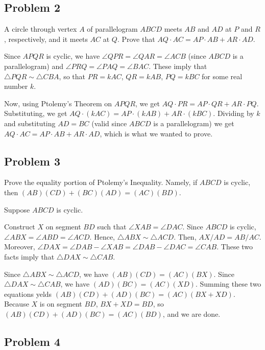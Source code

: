 \subsection{Problem 2}

A circle through vertex $ A$ of parallelogram $ ABCD$ meets $ AB$ and $ AD$ at $ P$ and $ R$, respectively, and it meets $ AC$ at $ Q$. Prove that $ AQ\cdot AC= AP \cdot AB + AR\cdot AD$.

\begin{mdsoln}
    Since $ APQR$ is cyclic, we have $ \angle QPR=\angle QAR=\angle ACB$ (since $ ABCD$ is a parallelogram) and $ \angle PRQ=\angle PAQ=\angle BAC$. These imply that $ \triangle PQR\sim \triangle CBA$, so that $ PR=kAC$, $ QR=kAB$, $ PQ=kBC$ for some real number $ k$.

    Now, using Ptolemy’s Theorem on $ APQR$, we get $ AQ\cdot PR=AP\cdot QR+AR\cdot PQ$. Substituting, we get $ AQ\cdot (kAC)=AP\cdot (kAB)+AR\cdot (kBC)$. Dividing by $ k$ and substituting $ AD=BC$ (valid since $ ABCD$ is a parallelogram) we get $ AQ\cdot AC= AP \cdot AB + AR\cdot AD$, which is what we wanted to prove.
\end{mdsoln}


\subsection{Problem 3}

Prove the equality portion of Ptolemy’s Inequality. Namely, if $ ABCD$ is cyclic, then $ (AB)(CD) + (BC)(AD) = (AC)(BD)$.

\begin{mdsoln}
    Suppose $ ABCD$ is cyclic.

Construct $ X$ on segment $ BD$ such that $ \angle XAB=\angle DAC$. Since $ ABCD$ is cyclic, $ \angle ABX=\angle ABD=\angle ACD$. Hence, $ \triangle ABX\sim \triangle ACD$. Then, $ AX/AD=AB/AC$. Moreover, $ \angle DAX=\angle DAB-\angle XAB=\angle DAB-\angle DAC=\angle CAB$. These two facts imply that $ \triangle DAX\sim \triangle CAB$.

Since $ \triangle ABX\sim \triangle ACD$, we have $ (AB)(CD)=(AC)(BX)$. Since $ \triangle DAX\sim \triangle CAB$, we have $ (AD)(BC)=(AC)(XD)$. Summing these two equations yelds $ (AB)(CD)+(AD)(BC)=(AC)(BX+XD)$. Because $ X$ is on segment $ BD$, $ BX+XD=BD$, so $ (AB)(CD)+(AD)(BC)=(AC)(BD)$, and we are done.

\end{mdsoln}


\subsection{Problem 4}

